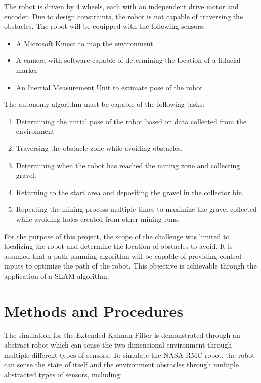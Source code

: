 \documentclass[journal]{IEEEtran}
\begin{document}
The robot is driven by 4 wheels, each with an independent drive motor and encoder. Due to 
design constraints, the robot is not capable of traversing the obstacles. The robot will be 
equipped with the following sensors:

\begin{itemize}
 \item A Microsoft Kinect to map the environment
 \item A camera with software capable of determining the location of a fiducial marker
 \item An Inertial Measurement Unit to estimate pose of the robot
\end{itemize}

The autonomy algorithm must be capable of the following tasks:

\begin{enumerate}
 \item Determining the initial pose of the robot based on data collected from the environment
 \item Traversing the obstacle zone while avoiding obstacles. 
 \item Determining when the robot has reached the mining zone and collecting gravel.
 \item Returning to the start area and depositing the gravel in the collector bin
 \item Repeating the mining process multiple times to maximize the gravel collected while 
 avoiding holes created from other mining runs.
\end{enumerate}

For the purpose of this project, the scope of the challenge was limited to localizing the robot
and determine the location of obstacles to avoid. It is assumed that a path planning algorithm 
will be capable of providing control inputs to optimize the path of the robot. This objective is 
achievable through the application of a SLAM algorithm.



\section{Methods and Procedures}

The simulation for the Extended Kalman Filter is demonstrated through an abstract robot which 
can sense the two-dimensional environment through multiple different types of sensors. To 
simulate the NASA RMC robot, the robot can sense the state of itself and the environment 
obstacles through multiple abstracted types of sensors, including:
\end{document}
